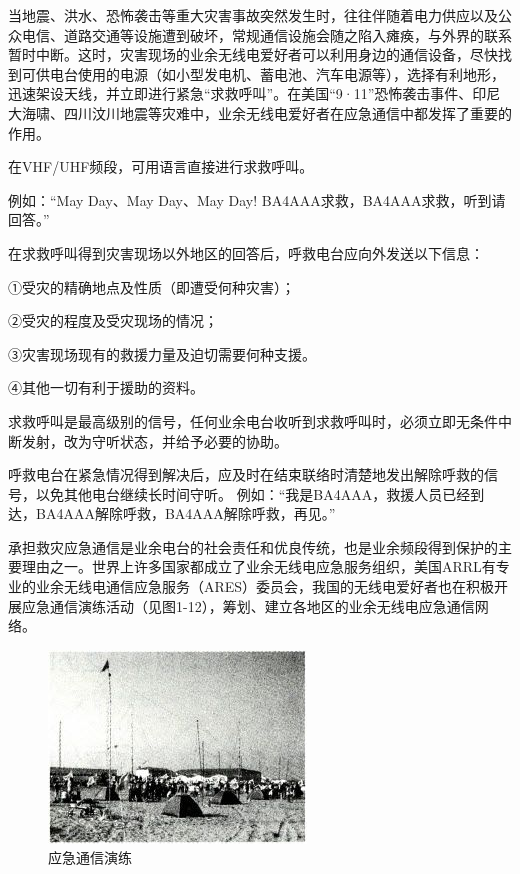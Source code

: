\documentclass[12pt,UTF8]{ctexbook}
\begin{document}
当地震、洪水、恐怖袭击等重大灾害事故突然发生时，往往伴随着电力供应以及公众电信、道路交通等设施遭到破坏，常规通信设施会随之陷入瘫痪，与外界的联系暂时中断。这时，灾害现场的业余无线电爱好者可以利用身边的通信设备，尽快找到可供电台使用的电源（如小型发电机、蓄电池、汽车电源等），选择有利地形，迅速架设天线，并立即进行紧急“求救呼叫”。在美国“9·11”恐怖袭击事件、印尼大海啸、四川汶川地震等灾难中，业余无线电爱好者在应急通信中都发挥了重要的作用。

在VHF/UHF频段，可用语言直接进行求救呼叫。

例如：“May Day、May Day、May Day! BA4AAA求救，BA4AAA求救，听到请回答。”

在求救呼叫得到灾害现场以外地区的回答后，呼救电台应向外发送以下信息：

①受灾的精确地点及性质（即遭受何种灾害）；

②受灾的程度及受灾现场的情况；

③灾害现场现有的救援力量及迫切需要何种支援。

④其他一切有利于援助的资料。

求救呼叫是最高级别的信号，任何业余电台收听到求救呼叫时，必须立即无条件中断发射，改为守听状态，并给予必要的协助。

呼救电台在紧急情况得到解决后，应及时在结束联络时清楚地发出解除呼救的信号，以免其他电台继续长时间守听。
例如：“我是BA4AAA，救援人员已经到达，BA4AAA解除呼救，BA4AAA解除呼救，再见。”

承担救灾应急通信是业余电台的社会责任和优良传统，也是业余频段得到保护的主要理由之一。世界上许多国家都成立了业余无线电应急服务组织，美国ARRL有专业的业余无线电通信应急服务（ARES）委员会，我国的无线电爱好者也在积极开展应急通信演练活动（见图1-12），筹划、建立各地区的业余无线电应急通信网络。

\begin{figure}[htbp]
	\centering
	\includegraphics[width=0.7\linewidth]{12}
	\caption{应急通信演练}
	\label{fig:1}
\end{figure}
\end{document}

